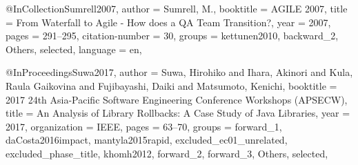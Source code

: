 @InCollection{Sumrell2007,
  author          = {Sumrell, M.},
  booktitle       = {AGILE 2007},
  title           = {From Waterfall to Agile - How does a QA Team Transition?},
  year            = {2007},
  pages           = {291–295},
  citation-number = {30},
  groups          = {kettunen2010, backward_2, Others, selected},
  language        = {en},
}

@InProceedings{Suwa2017,
  author       = {Suwa, Hirohiko and Ihara, Akinori and Kula, Raula Gaikovina and Fujibayashi, Daiki and Matsumoto, Kenichi},
  booktitle    = {2017 24th Asia-Pacific Software Engineering Conference Workshops (APSECW)},
  title        = {An Analysis of Library Rollbacks: A Case Study of Java Libraries},
  year         = {2017},
  organization = {IEEE},
  pages        = {63--70},
  groups       = {forward_1, daCosta2016impact, mantyla2015rapid, excluded_ec01_unrelated, excluded_phase_title, khomh2012, forward_2, forward_3, Others, selected},
}
